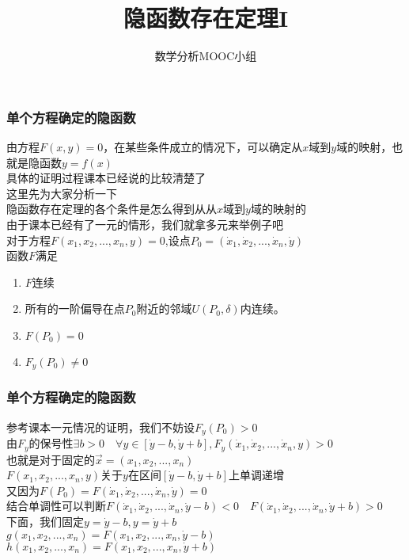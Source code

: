 \documentclass[xetex]{beamer}
\title{隐函数存在定理I}
\author{数学分析MOOC小组}
\date{}
\begin{document}
\frame{\maketitle}

\begin{frame}
    \frametitle{单个方程确定的隐函数}
	由方程$F(x,y)=0$，在某些条件成立的情况下，可以确定从$x$域到$y$域的映射，也就是隐函数$y=f(x)$\\
	具体的证明过程课本已经说的比较清楚了\\
	这里先为大家分析一下\\
	隐函数存在定理的各个条件是怎么得到从从$x$域到$y$域的映射的\\
	由于课本已经有了一元的情形，我们就拿多元来举例子吧\\
	对于方程$F(x_1,x_2,...,x_n,y)=0$,设点$P_0=(\dot x_1,\dot x_2,...,\dot x_n,\dot y)$\\
	函数$F$满足\\
	\begin{enumerate}
		\item
		$F$连续
		\item 
		所有的一阶偏导在点$P_0$附近的邻域$U(P_0,\delta)$内连续。
		\item
		$F(P_0)=0$
		\item
		$F_y(P_0)\not = 0$
	\end{enumerate}


\end{frame}

\begin{frame}
	\frametitle{单个方程确定的隐函数}
	参考课本一元情况的证明，我们不妨设$F_y(P_0)>0$\\ \pause
	由$F_y$的保号性\quad$\exists b>0 \quad \forall y \in [\dot y-b,\dot y+b],F_y(\dot x_1,\dot x_2,...,\dot x_n,y)>0$\\ \pause
	也就是对于固定的$\vec x=(x_1,x_2,...,x_n)$\\
	$F(x_1,x_2,...,x_n,y)$关于$y$在区间$[\dot y-b,\dot y+b]$上单调递增\\ \pause
	又因为$F(P_0)=F(\dot x_1,\dot x_2,...,\dot x_n,\dot y)=0$\\
	结合单调性可以判断$F(\dot x_1,\dot x_2,...,\dot x_n,\dot y-b)<0\quad F(\dot x_1,\dot x_2,...,\dot x_n,\dot y+b)>0$\\ \pause
	下面，我们固定$y=\dot y-b,y=\dot y+b$\\
	$g(x_1,x_2,...,x_n)=F(x_1,x_2,...,x_n,\dot y-b)$\\
	$h(x_1,x_2,...,x_n)=F(x_1,x_2,...,x_n,\dot y+b)$\\
	
\end{frame}
\end{document}
